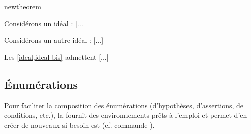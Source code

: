 \documentclass[french,nolocaltoc]{nwejmart}
\newtheorem[style=definition]{fait}
\newtheorem[title=expérience]{experience}
\newtheorem[title-plural=anneaux]{anneau}
\newtheorem[title=idéal,title-plural=idéaux]{ideal}
\begin{document}
\begin{docCommand}{newtheorem}{}
\begin{bodycode}[listing and text,listing options={deletekeywords={[2]label}}]
\begin{ideal}\label{ideal}
Considérons un idéal : [...]
\end{ideal}
\begin{ideal}\label{ideal-bis}
Considérons un autre idéal : [...]
\end{ideal}
Les \vref{ideal,ideal-bis} admettent [...]
\end{bodycode}

\end{docCommand}

\subsection{Énumérations}
\label{sec:list-dhyp-ou}

Pour faciliter la composition des énumérations (d'hypothèses, d'assertions, de
conditions, etc.), la \nwejmauthorcl{} fournit des environnements prêts
à l'emploi et permet d'en créer de nouveaux si besoin est (cf. commande
).
\end{document}
